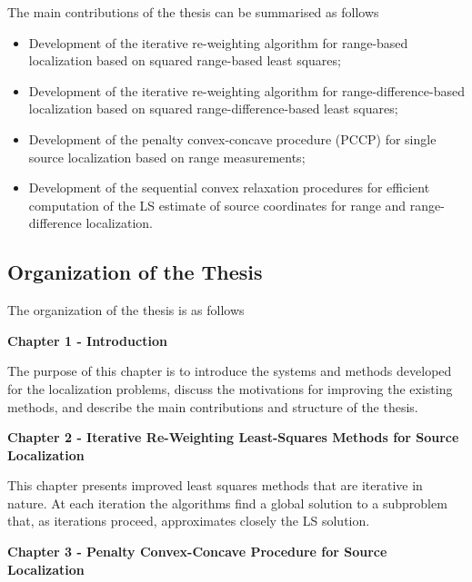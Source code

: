 The main contributions of the thesis can be summarised as follows

\begin{itemize}
\item
Development of the iterative re-weighting algorithm for range-based localization based on squared range-based least squares;

\item
Development of the iterative re-weighting algorithm for range-difference-based localization based on squared range-difference-based least squares;

\item
Development of the penalty convex-concave procedure (PCCP) for single source localization based on range measurements;

\item
Development of the sequential convex relaxation procedures for efficient computation of the LS estimate of source coordinates for range and range-difference localization.


\end{itemize}


\subsection{Organization of the Thesis} \label{organization}

The organization of the thesis is  as follows

\phantom{m}

\noindent
\textbf{Chapter 1 - Introduction}

\phantom{m}

\noindent
The purpose of this chapter is to introduce the systems and methods developed for the localization problems, discuss the motivations for improving the existing methods, and describe the main contributions and structure of the thesis.


\phantom{m}

\noindent
\textbf{Chapter 2 - Iterative Re-Weighting Least-Squares Methods for Source Localization}


\phantom{m}

\noindent
This chapter presents improved least squares methods that are iterative in nature. At each iteration the algorithms find a global solution to a subproblem that, as iterations proceed, approximates closely the LS solution.


\phantom{m}

\noindent
\textbf{Chapter 3 - Penalty Convex-Concave Procedure for Source Localization}


